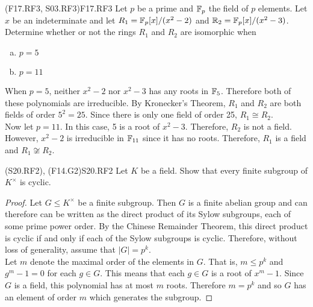 \documentclass[../AlgebraQualSolutions.tex]{subfiles}
\begin{document}
\begin{prob}{(F17.RF3, S03.RF3)}{F17.RF3}
    Let $p$ be a prime and $\mathbb{F}_p$ the field of $p$ elements. Let $x$ be an indeterminate and let $R_1 = \mathbb{F}_p[x]/(x^2 - 2)$ and $\mathbb{R}_2 = \mathbb{F}_p[x]/(x^2 - 3)$. Determine whether or not the rings $R_1$ and $R_2$ are isomorphic when
    \begin{enumerate}[(a)]
        \item $p = 5$
        \item $p = 11$
    \end{enumerate}
\end{prob}


\begin{solution}
When $p = 5$, neither $x^2 - 2$ nor $x^2 - 3$ has any roots in $\mathbb{F}_5$. Therefore both of these polynomials are irreducible. By Kronecker's Theorem, $R_1$ and $R_2$ are both fields of order $5^2 = 25$. Since there is only one field of order 25, $R_1 \cong R_2$.\\

Now let $p = 11$. In this case, 5 is a root of $x^2 - 3$. Therefore, $R_2$ is not a field. However, $x^2 - 2$ is irreducible in $\mathbb{F}_{11}$ since it has no roots. Therefore, $R_1$ is a field and $R_1 \not\cong R_2$.
\end{solution}

\begin{prob}{(S20.RF2), (F14.G2)}{S20.RF2}
Let $K$ be a field. Show that every finite subgroup of $K^\times$ is cyclic.
\end{prob}

\begin{proof}
	Let $G \leq K^\times$ be a finite subgroup. Then $G$ is a finite abelian group and can therefore can be written as the direct product of its Sylow subgroups, each of some prime power order. By the Chinese Remainder Theorem, this direct product is cyclic if and only if each of the Sylow subgroups is cyclic. Therefore, without loss of generality, assume that $|G| = p^k$.\\

	Let $m$ denote the maximal order of the elements in $G$. That is, $m \leq p^k$ and $g^m - 1 = 0$ for each $g \in G$. This  means that each $g \in G$ is a root of $x^m - 1$. Since $G$ is a field, this polynomial has at most $m$ roots. Therefore $m = p^k$ and so $G$ has an element of order $m$ which generates the subgroup.
\end{proof}
\end{document}
